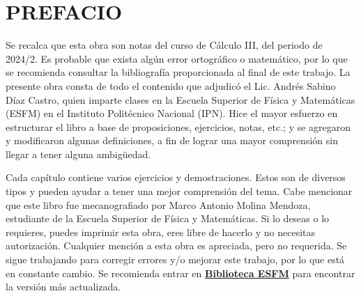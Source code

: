 \chapter*{PREFACIO}

Se recalca que esta obra son notas del curso de Cálculo III, del periodo de 2024/2. Es probable que exista algún error ortográfico o matemático, por lo que se recomienda consultar la bibliografía proporcionada al final de este trabajo. La presente obra consta de todo el contenido que adjudicó el Lic. Andrés Sabino Díaz Castro, quien imparte clases en la Escuela Superior de Física y Matemáticas (ESFM) en el Instituto Politécnico Nacional (IPN). Hice el mayor esfuerzo en estructurar el libro a base de proposiciones, ejercicios, notas, etc.; y se agregaron y modificaron algunas definiciones, a fin de lograr una mayor comprensión sin llegar a tener alguna ambigüedad.


Cada capítulo contiene varios ejercicios y demostraciones. Estos son de diversos tipos y pueden ayudar a tener una mejor comprensión del tema. Cabe mencionar que este libro fue mecanografiado por Marco Antonio Molina Mendoza, estudiante de la Escuela Superior de Física y Matemáticas. Si lo deseas o lo requieres, puedes imprimir esta obra, eres libre de hacerlo y no necesitas autorización. Cualquier mención a esta obra es apreciada, pero no requerida. Se sigue trabajando para corregir errores y/o mejorar este trabajo, por lo que está en constante cambio. Se recomienda entrar en  \href{https://linktr.ee/biblioteca_esfm}{\textbf{Biblioteca ESFM}} para encontrar la versión más actualizada.

